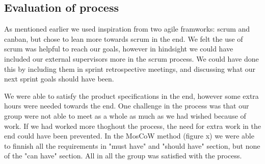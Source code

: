 \subsection{Evaluation of process}

As mentioned earlier we used inspiration from two agile framworks: scrum and canban, but chose to lean more towards scrum in the end. We felt the use of scrum was helpful to reach our goals, however in hindsight we could have included our external supervisors more in the scrum process. We could have done this by including them in sprint retrospective meetings, and discussing what our next sprint goals should have been. 

We were able to satisfy the product specifications in the end, however some extra hours were needed towards the end. One challenge in the process was that our group were not able to meet as a whole as much as we had wished because of work. If we had worked more thoghout the process, the need for extra work in the end could have been prevented. In the MosCoW method (figure x) we were able to finnish all the requirements in "must have" and "should have" section, but none of the "can have" section. All in all the group was satisfied with the process.